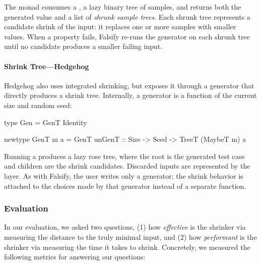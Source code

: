 \noindent The  monad consumes a , a lazy binary tree
of  samples, and returns both the generated value and a list of
\emph{shrunk sample trees}. Each shrunk tree represents a candidate shrink of
the input: it replaces one or more samples with smaller values. When a
property fails, Falsify re-runs the generator on each shrunk tree until no
candidate produces a smaller failing input.

\paragraph*{Shrink Tree---Hedgehog}

Hedgehog also uses integrated shrinking, but exposes it through a generator that
directly produces a shrink tree. Internally, a generator is a function of the current
size and random seed:

\begin{code}[language=Haskell]
    type Gen = GenT Identity

    newtype GenT m a = GenT {
        unGenT :: Size -> Seed -> TreeT (MaybeT m) a
    }
\end{code}

\noindent Running a  produces a lazy rose tree, where the root
is the generated test case and children are the shrink candidates.
Discarded inputs are represented by the  layer. As
with Falsify, the user writes only a generator; the shrink behavior is
attached to the choices made by that generator instead of a separate function.

\subsubsection{Evaluation}
\label{shrinkeval:sec:eval}

In our evaluation, we asked two questions, (1) how \emph{effective} is the shrinker via
measuring the distance to the truly minimal input, and (2) how \emph{performant} is the
shrinker via measuring the time it takes to shrink. Concretely, we measured the
following metrics for answering our questions:

